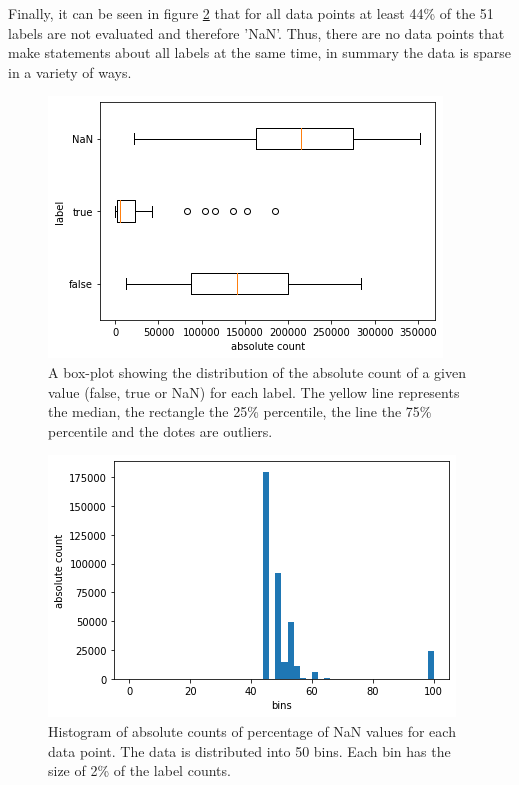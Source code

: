 Finally, it can be seen in figure \ref{abb:histogramm_data} that for all data points at least 44\% of the 51 labels are not evaluated and therefore 'NaN'. Thus, there are no data points that make statements about all labels at the same time, in summary the data is sparse in a variety of ways.

\begin{figure}[H]
	\begin{center}
		\includegraphics[scale=.8]{images/boxplot_label.png}
		\caption{A box-plot showing the distribution of the absolute count of a given value (false, true or NaN) for each label. The yellow line represents the median, the rectangle the 25\% percentile, the line the 75\% percentile and the dotes are outliers.}
		\label{abb:boxplot_label}
	\end{center}		
\end{figure}

\begin{figure}[H]
	\begin{center}
		\includegraphics[scale=.8]{images/hist.png}
		\caption{Histogram of absolute counts of percentage of NaN values for each data point. The data is distributed into 50 bins. Each bin has the size of 2\% of the label counts.}
		\label{abb:histogramm_data}
	\end{center}		
\end{figure}